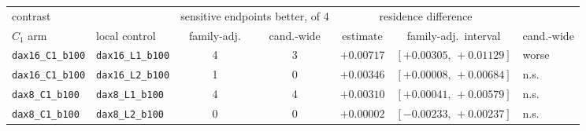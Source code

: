 \begin{tabular}{l l cc cc l}
\toprule
\multicolumn{2}{l}{contrast} & \multicolumn{2}{c}{sensitive endpoints better, of 4} & \multicolumn{2}{c}{residence difference} & \\
\cmidrule(lr){3-4}\cmidrule(lr){5-6}
$C_1$ arm & local control & family-adj. & cand.-wide & estimate & family-adj.\ interval & cand.-wide \\
\midrule
\texttt{dax16\_C1\_b100} & \texttt{dax16\_L1\_b100} & 4 & 3 & $+0.00717$ & $[+0.00305,\,+0.01129]$ & worse \\
\texttt{dax16\_C1\_b100} & \texttt{dax16\_L2\_b100} & 1 & 0 & $+0.00346$ & $[+0.00008,\,+0.00684]$ & n.s. \\
\texttt{dax8\_C1\_b100} & \texttt{dax8\_L1\_b100} & 4 & 4 & $+0.00310$ & $[+0.00041,\,+0.00579]$ & n.s. \\
\texttt{dax8\_C1\_b100} & \texttt{dax8\_L2\_b100} & 0 & 0 & $+0.00002$ & $[-0.00233,\,+0.00237]$ & n.s. \\
\bottomrule
\end{tabular}
